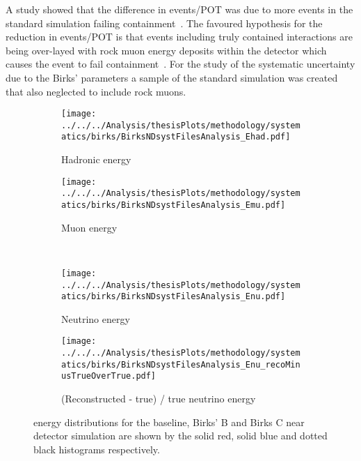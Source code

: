 A study showed that the difference in
events/POT was due to more events in the standard simulation failing
containment~\cite{LukeRocks}. 
The favoured hypothesis for the reduction in events/POT is that
events including truly contained interactions are being over-layed
with rock muon energy deposits within the detector which causes
the event to fail containment~\cite{SASummary}.
For the study of the systematic uncertainty due to the Birks'
parameters a sample of the standard simulation was created that also
neglected to include rock muons.
\newpage

\begin{figure}%
  \begin{subfigure}{.5\textwidth}
    \centering
    \texttt{[image: ../../../Analysis/thesisPlots/methodology/systematics/birks/BirksNDsystFilesAnalysis\_Ehad.pdf]}
    \caption{Hadronic energy}
    \label{fig:systsNDBirks_had}
  \end{subfigure}%
  \begin{subfigure}{.5\textwidth}
    \centering
    \texttt{[image: ../../../Analysis/thesisPlots/methodology/systematics/birks/BirksNDsystFilesAnalysis\_Emu.pdf]}
    \caption{Muon energy }
    \label{fig:systsNDBirks_mu}
  \end{subfigure}\\
  \begin{subfigure}{.5\textwidth}
    \centering
    \texttt{[image: ../../../Analysis/thesisPlots/methodology/systematics/birks/BirksNDsystFilesAnalysis\_Enu.pdf]}
    \caption{Neutrino energy}
    \label{fig:systsNDBirks_nu}
  \end{subfigure}%
  \begin{subfigure}{.5\textwidth}
    \centering
    \texttt{[image: ../../../Analysis/thesisPlots/methodology/systematics/birks/BirksNDsystFilesAnalysis\_Enu\_recoMinusTrueOverTrue.pdf]}
    \caption{(Reconstructed  - true) / true neutrino energy }
    \label{fig:systsNDBirks_rmtot}
  \end{subfigure}
  \caption{energy distributions for the baseline, Birks' B and Birks C
    near detector simulation are shown by the solid red, solid blue
    and dotted black histograms respectively. }
  \label{fig:systsNDBirks}
\end{figure}


